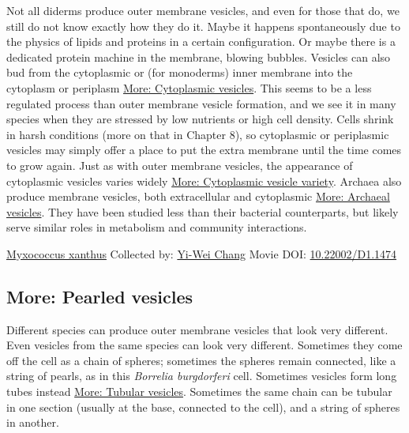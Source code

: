 \documentclass[]{tufte-book}
\begin{document}
Not all diderms produce outer membrane vesicles, and even for those that do, we still do not know exactly how they do it. Maybe it happens spontaneously due to the physics of lipids and proteins in a certain configuration. Or maybe there is a dedicated protein machine in the membrane, blowing bubbles. Vesicles can also bud from the cytoplasmic or (for monoderms) inner membrane into the cytoplasm or periplasm \protect\hyperlink{Cytoplasmic_vesicles}{More: Cytoplasmic vesicles}. This seems to be a less regulated process than outer membrane vesicle formation, and we see it in many species when they are stressed by low nutrients or high cell density. Cells shrink in harsh conditions (more on that in Chapter 8), so cytoplasmic or periplasmic vesicles may simply offer a place to put the extra membrane until the time comes to grow again. Just as with outer membrane vesicles, the appearance of cytoplasmic vesicles varies widely \protect\hyperlink{Cytoplasmic_vesicle_variety}{More: Cytoplasmic vesicle variety}. Archaea also produce membrane vesicles, both extracellular and cytoplasmic \protect\hyperlink{Archaeal_vesicles}{More: Archaeal vesicles}. They have been studied less than their bacterial counterparts, but likely serve similar roles in metabolism and community interactions.



\hypertarget{htmlwidget-13facf151b8ec5d98ce7}{}

\label{fig:2-4}\protect\hyperlink{tree}{Myxococcus xanthus} Collected by: \protect\hyperlink{yi-wei_chang}{Yi-Wei Chang} Movie DOI: \href{https://doi.org/10.22002/D1.1474}{10.22002/D1.1474}

\hypertarget{Pearled_vesicles}{%
\subsection*{More: Pearled vesicles}\label{Pearled_vesicles}}

Different species can produce outer membrane vesicles that look very different. Even vesicles from the same species can look very different. Sometimes they come off the cell as a chain of spheres; sometimes the spheres remain connected, like a string of pearls, as in this \emph{Borrelia burgdorferi} cell. Sometimes vesicles form long tubes instead \protect\hyperlink{Tubular_vesicles}{More: Tubular vesicles}. Sometimes the same chain can be tubular in one section (usually at the base, connected to the cell), and a string of spheres in another.
\end{document}
